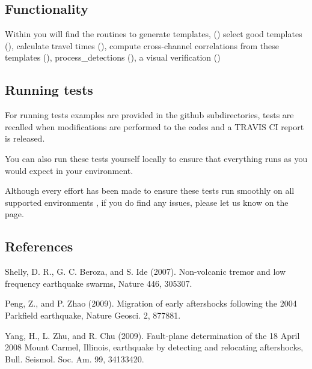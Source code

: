 \documentclass[a4paper,10pt,english]{sphinxmanual}
\begin{document}
\subsection{Functionality}
\label{\detokenize{intro:functionality}}
Within {\hyperref[\detokenize{input::doc}]{}} you will find the routines to generate templates,
({\hyperref[\detokenize{sub/input.create_templates::doc}]{}}) select good templates
({\hyperref[\detokenize{sub/input.template_check::doc}]{}}), calculate travel times
({\hyperref[\detokenize{sub/input.calculate_ttimes::doc}]{}}),
compute cross-channel correlations from these templates
({\hyperref[\detokenize{sub/main.pympa::doc}]{}}), process\_detections
({\hyperref[\detokenize{sub/output.process_detections::doc}]{}}), a visual verification
({\hyperref[\detokenize{sub/output.verify_detection::doc}]{}})


\subsection{Running tests}
\label{\detokenize{intro:running-tests}}
For running tests examples are provided in the github subdirectories, tests are recalled
when modifications are performed to the codes and a TRAVIS CI report is released.

You can also run these tests yourself locally to ensure
that everything runs as you would expect in your environment.

Although every effort has been made to ensure these tests run smoothly on all supported environments
, if you do find any issues, please let us know on the
 page.


\subsection{References}
\label{\detokenize{intro:references}}
Shelly, D. R., G. C. Beroza, and S. Ide (2007). Non-volcanic tremor and low
frequency earthquake swarms, Nature 446, 305\textendash{}307.

Peng, Z., and P. Zhao (2009). Migration of early aftershocks following the
2004 Parkfield earthquake, Nature Geosci. 2, 877\textendash{}881.

Yang, H., L. Zhu, and R. Chu (2009). Fault-plane determination of the
18 April 2008 Mount Carmel, Illinois, earthquake by detecting and
relocating aftershocks, Bull. Seismol. Soc. Am. 99, 3413\textendash{}3420.
\end{document}

